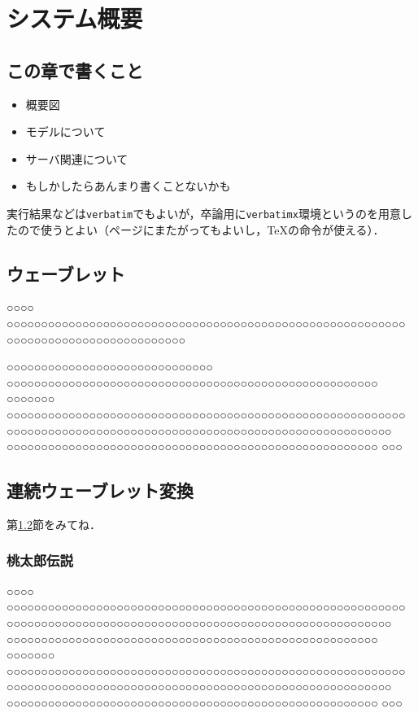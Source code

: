 

\chapter{システム概要}
\section{この章で書くこと}
\begin{itemize}
	\item 概要図
	\item モデルについて
	\item サーバ関連について
	\item もしかしたらあんまり書くことないかも
\end{itemize}





実行結果などは\texttt{verbatim}でもよいが，卒論用に\texttt{verbatimx}環境というのを用意したので使うとよい（ページにまたがってもよいし，\TeX の命令が使える）．






\section{ウェーブレット}\label{AAAB}
○○○○ ○○○○○○○○○○○○○○○○○○○○○○○○○○○○○○○○○○○○○○○○○○○○○○○○○○○○○○○○○○ ○○○○○○○○○○○○○○○○○○○○○○○○○○

○○○○○○○○○○○○○○○○○○○○○○○○○○○○○○ ○○○○○○○○○○○○○○○○○○○○○○○○○○○○○○○○○○○○○○○○○○○○○○○○○○○○○○ ○○○○○○○ ○○○○○○○○○○○○○○○○○○○○○○○○○○○○○○○○○○○○○○○○○○○○○○○○○○○○○○○○○○ ○○○○○○○○○○○○○○○○○○○○○○○○○○○○○○○○○○○○○○○○○○○○○○○○○○○○○○○○ ○○○○○○○○○○○○○○○○○○○○○○○○○○○○○○○○○○○○○○○○○○○○○○○○○○○○○○ ○○○
\section{連続ウェーブレット変換}

第\ref{AAAB}節をみてね．

\subsection{桃太郎伝説}
○○○○ ○○○○○○○○○○○○○○○○○○○○○○○○○○○○○○○○○○○○○○○○○○○○○○○○○○○○○○○○○○ ○○○○○○○○○○○○○○○○○○○○○○○○○○○○○○○○○○○○○○○○○○○○○○○○○○○○○○○○ ○○○○○○○○○○○○○○○○○○○○○○○○○○○○○○○○○○○○○○○○○○○○○○○○○○○○○○ ○○○○○○○ ○○○○○○○○○○○○○○○○○○○○○○○○○○○○○○○○○○○○○○○○○○○○○○○○○○○○○○○○○○ ○○○○○○○○○○○○○○○○○○○○○○○○○○○○○○○○○○○○○○○○○○○○○○○○○○○○○○○○ ○○○○○○○○○○○○○○○○○○○○○○○○○○○○○○○○○○○○○○○○○○○○○○○○○○○○○○ ○○○


